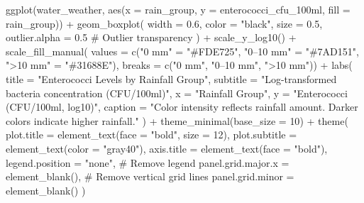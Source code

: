 \documentclass[
  11pt,
]{article}
\newenvironment{Shaded}{\begin{snugshade}}{\end{snugshade}}
\newcommand{\AttributeTok}[1]{\textcolor[rgb]{0.40,0.45,0.13}{#1}}
\newcommand{\CommentTok}[1]{\textcolor[rgb]{0.37,0.37,0.37}{#1}}
\newcommand{\DecValTok}[1]{\textcolor[rgb]{0.68,0.00,0.00}{#1}}
\newcommand{\FloatTok}[1]{\textcolor[rgb]{0.68,0.00,0.00}{#1}}
\newcommand{\FunctionTok}[1]{\textcolor[rgb]{0.28,0.35,0.67}{#1}}
\newcommand{\NormalTok}[1]{\textcolor[rgb]{0.00,0.23,0.31}{#1}}
\newcommand{\OtherTok}[1]{\textcolor[rgb]{0.00,0.23,0.31}{#1}}
\newcommand{\SpecialCharTok}[1]{\textcolor[rgb]{0.37,0.37,0.37}{#1}}
\newcommand{\StringTok}[1]{\textcolor[rgb]{0.13,0.47,0.30}{#1}}
\begin{document}
\begin{Shaded}
\begin{Highlighting}[]
\FunctionTok{ggplot}\NormalTok{(water\_weather, }
       \FunctionTok{aes}\NormalTok{(}\AttributeTok{x =}\NormalTok{ rain\_group, }
           \AttributeTok{y =}\NormalTok{ enterococci\_cfu\_100ml, }
           \AttributeTok{fill =}\NormalTok{ rain\_group)) }\SpecialCharTok{+}  
  \FunctionTok{geom\_boxplot}\NormalTok{(}
    \AttributeTok{width =} \FloatTok{0.6}\NormalTok{,                }
    \AttributeTok{color =} \StringTok{"black"}\NormalTok{,            }
    \AttributeTok{size =} \FloatTok{0.5}\NormalTok{,                 }
    \AttributeTok{outlier.alpha =} \FloatTok{0.5}   \CommentTok{\# Outlier transparency}
\NormalTok{  ) }\SpecialCharTok{+}
  \FunctionTok{scale\_y\_log10}\NormalTok{() }\SpecialCharTok{+}
  \FunctionTok{scale\_fill\_manual}\NormalTok{(}
    \AttributeTok{values =} \FunctionTok{c}\NormalTok{(}\StringTok{"0 mm"} \OtherTok{=} \StringTok{"\#FDE725"}\NormalTok{,    }
               \StringTok{"0–10 mm"} \OtherTok{=} \StringTok{"\#7AD151"}\NormalTok{,}
               \StringTok{"\textgreater{}10 mm"} \OtherTok{=} \StringTok{"\#31688E"}\NormalTok{), }
    \AttributeTok{breaks =} \FunctionTok{c}\NormalTok{(}\StringTok{"0 mm"}\NormalTok{, }\StringTok{"0–10 mm"}\NormalTok{, }\StringTok{"\textgreater{}10 mm"}\NormalTok{)) }\SpecialCharTok{+}
  \FunctionTok{labs}\NormalTok{(}
    \AttributeTok{title =} \StringTok{"Enterococci Levels by Rainfall Group"}\NormalTok{,}
    \AttributeTok{subtitle =} \StringTok{"Log{-}transformed bacteria concentration (CFU/100ml)"}\NormalTok{,}
    \AttributeTok{x =} \StringTok{"Rainfall Group"}\NormalTok{,}
    \AttributeTok{y =} \StringTok{"Enterococci (CFU/100ml, log10)"}\NormalTok{,}
    \AttributeTok{caption =} \StringTok{"Color intensity reflects rainfall amount. Darker colors indicate higher rainfall."}
\NormalTok{  ) }\SpecialCharTok{+}
  \FunctionTok{theme\_minimal}\NormalTok{(}\AttributeTok{base\_size =} \DecValTok{10}\NormalTok{) }\SpecialCharTok{+}
  \FunctionTok{theme}\NormalTok{(}
    \AttributeTok{plot.title =} \FunctionTok{element\_text}\NormalTok{(}\AttributeTok{face =} \StringTok{"bold"}\NormalTok{, }\AttributeTok{size =} \DecValTok{12}\NormalTok{),}
    \AttributeTok{plot.subtitle =} \FunctionTok{element\_text}\NormalTok{(}\AttributeTok{color =} \StringTok{"gray40"}\NormalTok{),}
    \AttributeTok{axis.title =} \FunctionTok{element\_text}\NormalTok{(}\AttributeTok{face =} \StringTok{"bold"}\NormalTok{),}
    \AttributeTok{legend.position =} \StringTok{"none"}\NormalTok{,     }\CommentTok{\# Remove legend}
    \AttributeTok{panel.grid.major.x =} \FunctionTok{element\_blank}\NormalTok{(), }\CommentTok{\# Remove vertical grid lines}
    \AttributeTok{panel.grid.minor =} \FunctionTok{element\_blank}\NormalTok{()}
\NormalTok{  )}
\end{Highlighting}
\end{Shaded}
\end{document}
